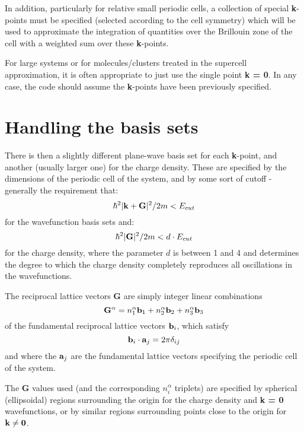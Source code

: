 In addition,
particularly for relative small periodic cells, a collection of
special {\bf k}-points must be specified (selected according to the
cell symmetry) which will be used to approximate the integration of
quantities over the Brillouin zone of the cell with a weighted sum
over these {\bf k}-points.

For large systems or for molecules/clusters treated in the supercell
approximation, it is often appropriate to just use the single point
{\bf k = 0}. In any case, the code should assume the {\bf k}-points
have been previously specified.

\section{Handling the basis sets}

There is then a slightly different plane-wave basis set for each
{\bf k}-point, and another (usually larger one) for the charge density.
These are specified by the dimensions of the periodic
cell of the system, and by some sort of cutoff - generally the requirement
that:
\begin{equation}
\hbar^2|{\bf k + G}|^2/2m < E_{cut}
\end{equation}
for the wavefunction basis sets and:
\begin{equation}
\hbar^2 |{\bf G}|^2/2m < d \cdot E_{cut}
\end{equation}
for the charge density, where the parameter $d$ is between 1 and 4 and
determines the degree to which the charge density completely reproduces 
all oscillations in the wavefunctions.

The reciprocal lattice vectors {\bf G} are simply integer linear combinations
\begin{equation}
{\bf G}^{\alpha} = n^{\alpha}_1 {\bf b}_1 + n^{\alpha}_2 {\bf b}_2 +
			n^{\alpha}_3 {\bf b}_3
\end{equation}
of the fundamental reciprocal lattice vectors ${\bf b}_i$, which satisfy
\begin{equation}
{\bf b}_i \cdot {\bf a}_j = 2 \pi \delta_{ij}
\end{equation}
and where the ${\bf a}_j$ are the fundamental lattice vectors specifying
the periodic cell of the system.

The {\bf G} values used (and the corresponding $n^{\alpha}_i$ triplets)
are specified by spherical (ellipsoidal) regions surrounding the origin for
the charge density and {\bf k = 0} wavefunctions, or by similar regions
surrounding points close to the origin for ${\bf k} \neq {\bf 0}$.

